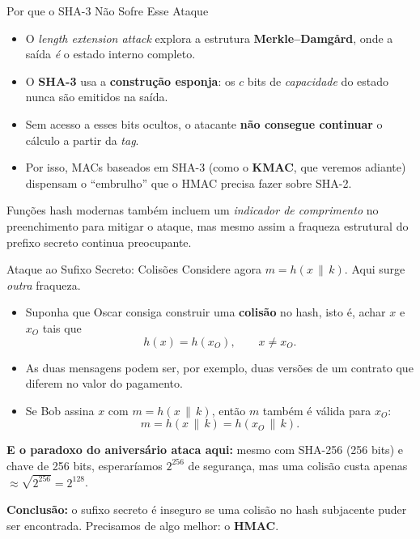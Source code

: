 \documentclass{beamer}
\begin{document}
\begin{frame}{Por que o SHA-3 Não Sofre Esse Ataque}
    \begin{itemize}
        \item O \textit{length extension attack} explora a estrutura \textbf{Merkle--Damgård}, onde a saída \emph{é} o estado interno completo.
        \medskip
        \item O \textbf{SHA-3} usa a \textbf{construção esponja}: os $c$ bits de \emph{capacidade} do estado \alert{nunca são emitidos} na saída.
        \medskip
        \item Sem acesso a esses bits ocultos, o atacante \textbf{não consegue continuar} o cálculo a partir da \textit{tag}.
        \medskip
        \item Por isso, MACs baseados em SHA-3 (como o \textbf{KMAC}, que veremos adiante) dispensam o ``embrulho'' que o HMAC precisa fazer sobre SHA-2.
    \end{itemize}
    \medskip
    \begin{tcolorbox}[colback=blue!5,colframe=blue!50!black,boxrule=0.5pt]
        \footnotesize
        Funções hash modernas também incluem um \emph{indicador de comprimento} no preenchimento para mitigar o ataque, mas mesmo assim a fraqueza estrutural do prefixo secreto continua preocupante.
    \end{tcolorbox}
\end{frame}

\begin{frame}{Ataque ao Sufixo Secreto: Colisões}
    Considere agora $m = h(x \,\|\, k)$. Aqui surge \emph{outra} fraqueza.
    \medskip
    \begin{itemize}
        \footnotesize
        \item Suponha que Oscar consiga construir uma \textbf{colisão} no hash, isto é, achar $x$ e $x_O$ tais que
        \[
            h(x) = h(x_O), \qquad x \neq x_O.
        \]
        \item As duas mensagens podem ser, por exemplo, duas versões de um contrato que diferem no valor do pagamento.
        \item Se Bob assina $x$ com $m = h(x \,\|\, k)$, então \alert{$m$ também é válida para $x_O$}:
        \[
            m = h(x \,\|\, k) = h(x_O \,\|\, k).
        \]
    \end{itemize}
    \medskip
    \textbf{E o paradoxo do aniversário ataca aqui:} mesmo com SHA-256 (256 bits) e chave de 256 bits, esperaríamos $2^{256}$ de segurança, mas uma colisão custa apenas $\approx \sqrt{2^{256}} = 2^{128}$.
    \medskip
    \begin{tcolorbox}[colback=red!5,colframe=red!60!black,boxrule=0.5pt]
        \footnotesize
        \textbf{Conclusão:} o sufixo secreto é inseguro se uma colisão no hash subjacente puder ser encontrada. Precisamos de algo melhor: o \textbf{HMAC}.
    \end{tcolorbox}
\end{frame}
\end{document}
